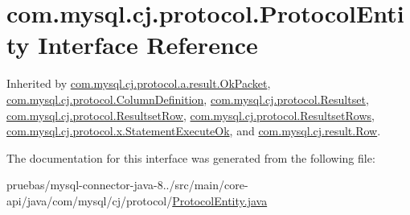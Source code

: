 \hypertarget{interfacecom_1_1mysql_1_1cj_1_1protocol_1_1_protocol_entity}{}\section{com.\+mysql.\+cj.\+protocol.\+Protocol\+Entity Interface Reference}
\label{interfacecom_1_1mysql_1_1cj_1_1protocol_1_1_protocol_entity}


Inherited by \mbox{\hyperlink{classcom_1_1mysql_1_1cj_1_1protocol_1_1a_1_1result_1_1_ok_packet}{com.\+mysql.\+cj.\+protocol.\+a.\+result.\+Ok\+Packet}}, \mbox{\hyperlink{interfacecom_1_1mysql_1_1cj_1_1protocol_1_1_column_definition}{com.\+mysql.\+cj.\+protocol.\+Column\+Definition}}, \mbox{\hyperlink{interfacecom_1_1mysql_1_1cj_1_1protocol_1_1_resultset}{com.\+mysql.\+cj.\+protocol.\+Resultset}}, \mbox{\hyperlink{interfacecom_1_1mysql_1_1cj_1_1protocol_1_1_resultset_row}{com.\+mysql.\+cj.\+protocol.\+Resultset\+Row}}, \mbox{\hyperlink{interfacecom_1_1mysql_1_1cj_1_1protocol_1_1_resultset_rows}{com.\+mysql.\+cj.\+protocol.\+Resultset\+Rows}}, \mbox{\hyperlink{classcom_1_1mysql_1_1cj_1_1protocol_1_1x_1_1_statement_execute_ok}{com.\+mysql.\+cj.\+protocol.\+x.\+Statement\+Execute\+Ok}}, and \mbox{\hyperlink{interfacecom_1_1mysql_1_1cj_1_1result_1_1_row}{com.\+mysql.\+cj.\+result.\+Row}}.



The documentation for this interface was generated from the following file\+:\begin{DoxyCompactItemize}
\item 
pruebas/mysql-\/connector-\/java-\/8../src/main/core-\/api/java/com/mysql/cj/protocol/\mbox{\hyperlink{_protocol_entity_8java}{Protocol\+Entity.\+java}}\end{DoxyCompactItemize}
